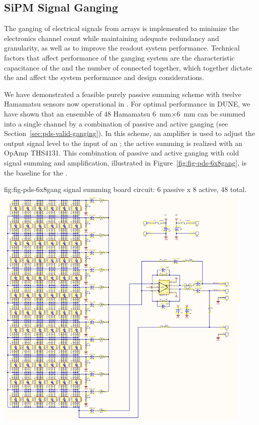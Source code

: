 \subsection{SiPM Signal Ganging}
\label{sec:pds-design-ganging}

The ganging of electrical signals from  arrays is implemented to minimize the electronics channel count while maintaining adequate redundancy and granularity, as well as to improve the readout system performance.  
Technical factors that affect performance of the ganging system are the characteristic capacitance of the  and the number of  connected together, which together dictate the  and affect the system performance and design considerations.

We have demonstrated a feasible purely passive summing scheme with twelve Hamamatsu  sensors now operational in . For optimal performance in DUNE, we have shown that an ensemble of 48 Hamamatsu \SI{6}{mm}$\times$\SI{6}{mm}  can be summed into a single channel by a combination of passive and active ganging (see Section~\ref{sec:pds-valid-ganging}).  In this scheme, an amplifier is used to adjust the  output signal level to the input of an ; the active summing is realized with an OpAmp THS4131. This combination of passive and active ganging with cold signal summing and amplification, illustrated in Figure~\ref{fig:fig-pds-6x8gang}, is the baseline for the .

\begin{dunefigure}
 {fig:fig-pds-6x8gang}
 { signal summing board circuit: 6 passive  x 8 active, 48  total.}
\includegraphics[height=12cm]{graphics/pds_gang_fig2.png}
\end{dunefigure}

